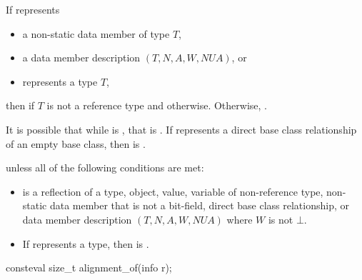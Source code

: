 \begin{itemdescr}
\pnum
\returns
If  represents
\begin{itemize}
\item a non-static data member of type $T$,
\item a data member description $(T, N, A, W, \mathit{NUA})$, or
\item {} represents a type $T$,
\end{itemize}
then  if $T$ is not a reference type
and  otherwise.
Otherwise, .
\begin{note}
It is possible that while 
is ,
that 
is .
If  represents a direct base class relationship of an empty base class,
then  is .
\end{note}

\pnum
\throws
{} unless
all of the following conditions are met:
\begin{itemize}
\item
{} is a reflection of a
type,
object,
value,
variable of non-reference type,
non-static data member that is not a bit-field,
direct base class relationship, or
data member description $(T, N, A, W, \mathit{NUA})$
where $W$ is not $\bot$.
\item
If  represents a type,
then  is .
\end{itemize}
\end{itemdescr}

%
\begin{itemdecl}
consteval size_t alignment_of(info r);
\end{itemdecl}

